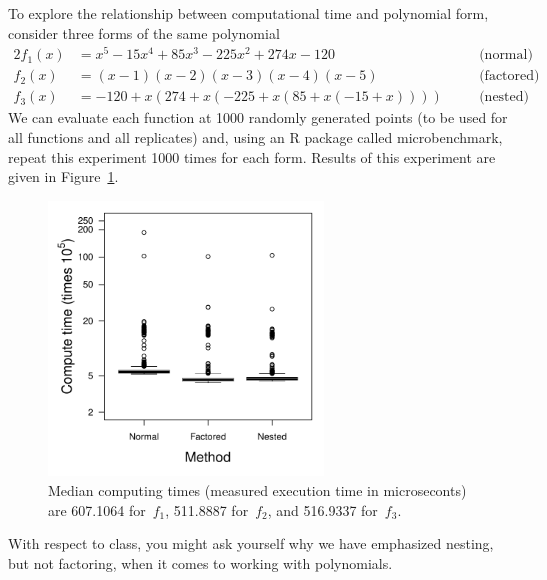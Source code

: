 \documentclass[12pt]{article}
\begin{document}
To explore the relationship between computational time and polynomial form, consider three forms of the same polynomial
\begin{alignat*}{2}
f_1(x) & = x^5 - 15x^4 + 85x^3 - 225x^2 + 274x -120 && \quad\text{(normal)}\\
%
f_2(x) & = (x - 1)(x - 2)(x - 3)(x - 4)(x - 5) && \quad\text{(factored)}\\
%
f_3(x) & = -120 + x(274 + x(-225 + x(85 + x(-15 + x)))) && \quad\text{(nested)}
\end{alignat*}
%
We can evaluate each function at 1000 randomly generated points (to be used for all functions and all replicates) and, using an \textsf{R} package called \textsf{microbenchmark}, repeat this experiment 1000 times for each form.  Results of this experiment are given in Figure~\ref{fig::plots}.
%
\begin{figure}[h!]\centering
\includegraphics[width=0.65\textwidth]{polynomial_evaluation_plot.pdf}
\caption{Median computing times (measured execution time in microseconts) are 607.1064 for~\(f_1\),  511.8887 for~\(f_2\), and 516.9337 for~\(f_3\).}\label{fig::plots}
\end{figure}


\noindent With respect to class, you might ask yourself why we have emphasized nesting, but not factoring, when it comes to working with polynomials.

%
\end{document}
